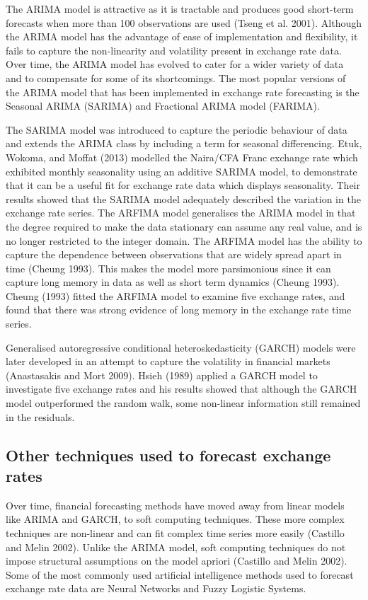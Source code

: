 \documentclass[12pt,a4paper]{article}
\numberwithin{equation}{section}
\numberwithin{figure}{section}
\numberwithin{table}{section}
\begin{document}
The ARIMA model is attractive as it is tractable and produces good
short-term forecasts when more than 100 observations are used (Tseng et
al. 2001). Although the ARIMA model has the advantage of ease of
implementation and flexibility, it fails to capture the non-linearity
and volatility present in exchange rate data. Over time, the ARIMA model
has evolved to cater for a wider variety of data and to compensate for
some of its shortcomings. The most popular versions of the ARIMA model
that has been implemented in exchange rate forecasting is the Seasonal
ARIMA (SARIMA) and Fractional ARIMA model (FARIMA).

The SARIMA model was introduced to capture the periodic behaviour of
data and extends the ARIMA class by including a term for seasonal
differencing. Etuk, Wokoma, and Moffat (2013) modelled the Naira/CFA
Franc exchange rate which exhibited monthly seasonality using an
additive SARIMA model, to demonstrate that it can be a useful fit for
exchange rate data which displays seasonality. Their results showed that
the SARIMA model adequately described the variation in the exchange rate
series. The ARFIMA model generalises the ARIMA model in that the degree
required to make the data stationary can assume any real value, and is
no longer restricted to the integer domain. The ARFIMA model has the
ability to capture the dependence between observations that are widely
spread apart in time (Cheung 1993). This makes the model more
parsimonious since it can capture long memory in data as well as short
term dynamics (Cheung 1993). Cheung (1993) fitted the ARFIMA model to
examine five exchange rates, and found that there was strong evidence of
long memory in the exchange rate time series.

Generalised autoregressive conditional heteroskedasticity (GARCH) models
were later developed in an attempt to capture the volatility in
financial markets (Anastasakis and Mort 2009). Hsieh (1989) applied a
GARCH model to investigate five exchange rates and his results showed
that although the GARCH model outperformed the random walk, some
non-linear information still remained in the residuals.

\subsection{Other techniques used to forecast exchange
rates}\label{other-techniques-used-to-forecast-exchange-rates}

Over time, financial forecasting methods have moved away from linear
models like ARIMA and GARCH, to soft computing techniques. These more
complex techniques are non-linear and can fit complex time series more
easily (Castillo and Melin 2002). Unlike the ARIMA model, soft computing
techniques do not impose structural assumptions on the model apriori
(Castillo and Melin 2002). Some of the most commonly used artificial
intelligence methods used to forecast exchange rate data are Neural
Networks and Fuzzy Logistic Systems.
\end{document}
